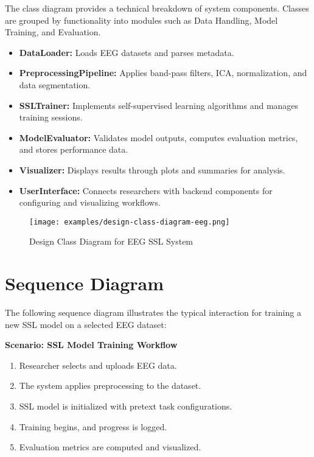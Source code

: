 The class diagram provides a technical breakdown of system components. Classes are grouped by functionality into modules such as Data Handling, Model Training, and Evaluation.

\begin{itemize}
    \item \textbf{DataLoader:} Loads EEG datasets and parses metadata.
    \item \textbf{PreprocessingPipeline:} Applies band-pass filters, ICA, normalization, and data segmentation.
    \item \textbf{SSLTrainer:} Implements self-supervised learning algorithms and manages training sessions.
    \item \textbf{ModelEvaluator:} Validates model outputs, computes evaluation metrics, and stores performance data.
    \item \textbf{Visualizer:} Displays results through plots and summaries for analysis.
    \item \textbf{UserInterface:} Connects researchers with backend components for configuring and visualizing workflows.
\end{itemize}

\begin{figure}[H]
    \centering
    \texttt{[image: examples/design-class-diagram-eeg.png]}
    \caption{Design Class Diagram for EEG SSL System}
\end{figure}

\section{Sequence Diagram}
\label{section:sequence-diagram}

The following sequence diagram illustrates the typical interaction for training a new SSL model on a selected EEG dataset:

\textbf{Scenario: SSL Model Training Workflow}
\begin{enumerate}
    \item Researcher selects and uploads EEG data.
    \item The system applies preprocessing to the dataset.
    \item SSL model is initialized with pretext task configurations.
    \item Training begins, and progress is logged.
    \item Evaluation metrics are computed and visualized.
\end{enumerate}

